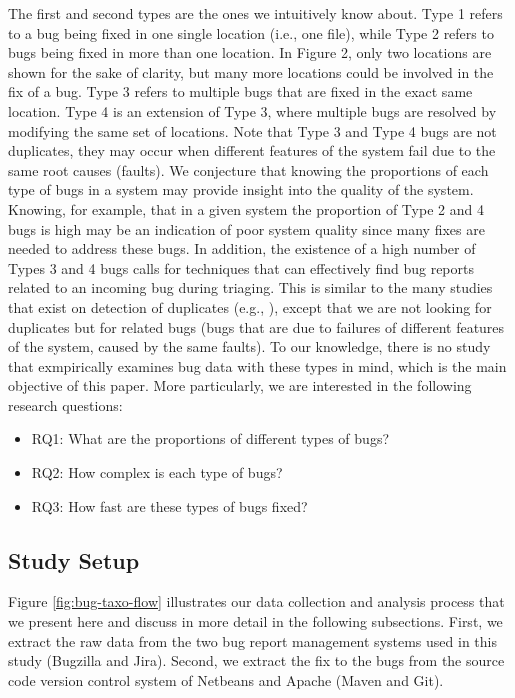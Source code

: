 The first and second types are the ones we intuitively know
about. Type 1 refers to a bug being fixed in one single location
(i.e., one file), while Type 2 refers to bugs being fixed in more
than one location. In Figure 2, only two locations are shown
for the sake of clarity, but many more locations could be
involved in the fix of a bug. Type 3 refers to multiple bugs that
are fixed in the exact same location. Type 4 is an extension of
Type 3, where multiple bugs are resolved by modifying the
same set of locations. Note that Type 3 and Type 4 bugs are
not duplicates, they may occur when different features of the
system fail due to the same root causes (faults).
We conjecture that knowing the proportions of each type
of bugs in a system may provide insight into the quality of the
system. Knowing, for example, that in a given system the
proportion of Type 2 and 4 bugs is high may be an indication
of poor system quality since many fixes are needed to address
these bugs. In addition, the existence of a high number of
Types 3 and 4 bugs calls for techniques that can effectively
find bug reports related to an incoming bug during triaging.
This is similar to the many studies that exist on detection of
duplicates (e.g., \cite{Runeson2007,Sun2010,Nguyen2012}), except that we are not looking for
duplicates but for related bugs (bugs that are due to failures of
different features of the system, caused by the same faults). To
our knowledge, there is no study that exmpirically examines
bug data with these types in mind, which is the main objective
of this paper. More particularly, we are interested in the
following research questions:

\begin{itemize}
	\item RQ1: What are the proportions of different types of bugs?
	\item RQ2: How complex is each type of bugs?
	\item RQ3: How fast are these types of bugs fixed?
\end{itemize}


\subsection{Study Setup}

Figure \ref{fig:bug-taxo-flow} illustrates our data collection and analysis
process that we present here and discuss in more detail in the
following subsections. First, we extract the raw data from the
two bug report management systems used in this study
(Bugzilla and Jira). Second, we extract the fix to the bugs
from the source code version control system of Netbeans and
Apache (Maven and Git).

